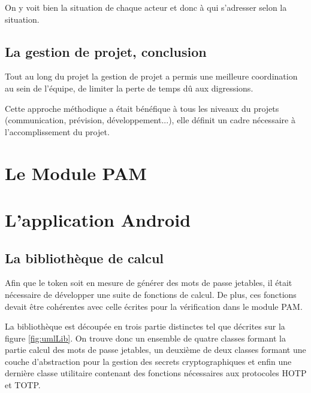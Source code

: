 On y voit bien la situation de chaque acteur et donc à qui s'adresser selon la situation.


\subsection{La gestion de projet, conclusion}

Tout au long du projet la gestion de projet a permis une meilleure coordination au sein de l'équipe, de limiter la perte de temps dû aux digressions.

Cette approche méthodique a était bénéfique à tous les niveaux du projets (communication, prévision, développement...), elle définit un cadre nécessaire à l'accomplissement du projet.

\section{Le Module PAM}

\section{L'application Android}
\subsection{La bibliothèque de calcul}
Afin que le token soit en mesure de générer des mots de passe jetables, il était
nécessaire de développer une suite de fonctions de calcul. De plus, ces fonctions devait
être cohérentes avec celle écrites pour la vérification dans le module PAM.

La bibliothèque est découpée en trois partie distinctes tel que décrites sur la figure
\ref{fig:umlLib}. On trouve donc un ensemble de quatre classes formant la partie calcul
des mots de passe jetables, un deuxième de deux classes formant une couche d'abstraction
pour la gestion des secrets cryptographiques et enfin une dernière classe utilitaire 
contenant des fonctions nécessaires aux protocoles HOTP et TOTP.


